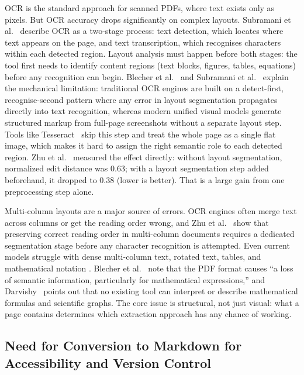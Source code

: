 OCR is the standard approach for scanned PDFs, where text exists only as
pixels. But OCR accuracy drops significantly on complex layouts. Subramani
et al.\ \autocite{subramani2020} describe OCR as a two-stage process: text
detection, which locates where text appears on the page, and text
transcription, which recognises characters within each detected region.
Layout analysis must happen before both stages: the tool first needs to
identify content regions (text blocks, figures, tables, equations) before
any recognition can begin. Blecher et al.\ \autocite{blecher2023} and Subramani
et al.\ \autocite{subramani2020} explain the mechanical limitation: traditional
OCR engines are built on a detect-first, recognise-second pattern where any
error in layout segmentation propagates directly into text recognition,
whereas modern unified visual models generate structured markup from full-page
screenshots without a separate layout step. Tools like
Tesseract~\autocite{smith2007} skip this step and treat the whole page as a
single flat image, which makes it hard to assign the right semantic role to
each detected region. Zhu et al.\ \autocite{zhu2022} measured the effect
directly: without layout segmentation, normalized edit distance was 0.63;
with a layout segmentation step added beforehand, it dropped to 0.38 (lower
is better). That is a large gain from one preprocessing step alone.

Multi-column layouts are a major source of errors. OCR engines often merge
text across columns or get the reading order wrong, and Zhu et
al.\ \autocite{zhu2022} show that preserving correct reading order in
multi-column documents requires a dedicated segmentation stage before any
character recognition is attempted. Even current models struggle with dense
multi-column text, rotated text, tables, and mathematical notation
\autocite{subramani2020, meuschke2023}. Blecher et al.\ \autocite{blecher2023}
note that the PDF format causes ``a loss of semantic information,
particularly for mathematical expressions,'' and Darvishy~\autocite{darvishy2018}
points out that no existing tool can interpret or describe mathematical
formulas and scientific graphs. The core issue is structural, not just
visual: what a page contains determines which extraction approach has any
chance of working.

\subsection{Need for Conversion to Markdown for Accessibility and Version Control}
\label{sec:markdown_motivation}

